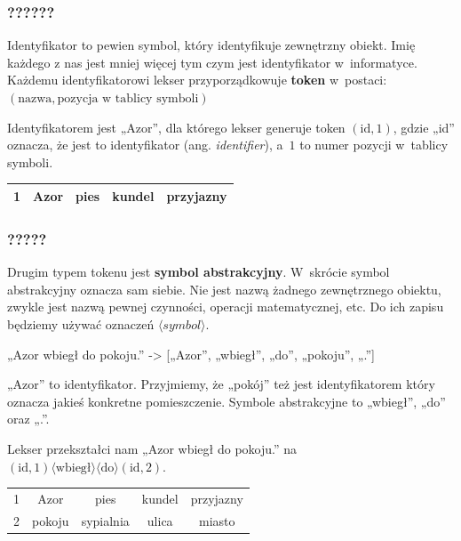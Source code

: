\documentclass[10pt,t]{beamer}
\begin{document}
\begin{frame}
  \frametitle{??????}


  Identyfikator to pewien symbol, który identyfikuje zewnętrzny obiekt.
  Imię każdego z nas jest mniej więcej tym czym jest identyfikator
  w~informatyce. Każdemu identyfikatorowi lekser przyporządkowuje
  \textbf{token} w~postaci: \\
  $( \text{nazwa}, \text{pozycja w tablicy symboli} )$

  Identyfikatorem jest „Azor”, dla którego lekser generuje token
  $( \text{id}, 1 )$, gdzie „id” oznacza, że jest to identyfikator (ang.
  \textit{identifier}), a~$1$ to numer pozycji w~tablicy symboli.

  \begin{center}

    \begin{tabular}{|c|c|c|c|c|}

      \hline
      1 & Azor & pies & kundel & przyjazny \\
      \hline
    \end{tabular}

  \end{center}

\end{frame}





\begin{frame}
  \frametitle{?????}


  Drugim typem tokenu jest \textbf{symbol abstrakcyjny}. W~skrócie symbol
  abstrakcyjny oznacza sam siebie. Nie jest nazwą żadnego zewnętrznego
  obiektu, zwykle jest nazwą pewnej czynności, operacji matematycznej, etc.
  Do ich zapisu będziemy używać oznaczeń $\langle symbol \rangle$.

  „Azor wbiegł do pokoju.” -> [„Azor”, „wbiegł”, „do”, „pokoju”, „.”]

  „Azor” to identyfikator. Przyjmiemy, że „pokój” też jest identyfikatorem
  który oznacza jakieś konkretne pomieszczenie. Symbole abstrakcyjne to
  „wbiegł”, „do” oraz „.”.

  Lekser przekształci nam „Azor wbiegł do pokoju.” na \\
  $( \text{id}, 1 ) \langle \text{wbiegł} \rangle \langle \text{do} \rangle ( \text{id}, 2 )$.

  \begin{center}

    \begin{tabular}{|c|c|c|c|c|}

      \hline
      1 & Azor & pies & kundel & przyjazny \\
      2 & pokoju & sypialnia & ulica & miasto \\
      \hline
    \end{tabular}

  \end{center}

\end{frame}
\end{document}
